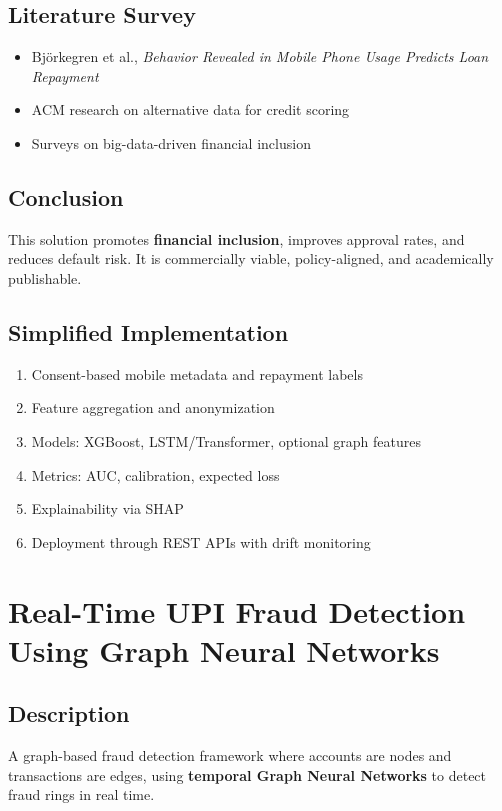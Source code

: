 \documentclass[11pt,a4paper]{article}
\begin{document}
\subsection*{Literature Survey}
\begin{itemize}[noitemsep]
    \item Björkegren et al., \textit{Behavior Revealed in Mobile Phone Usage Predicts Loan Repayment}
    \item ACM research on alternative data for credit scoring
    \item Surveys on big-data-driven financial inclusion
\end{itemize}

\subsection*{Conclusion}
This solution promotes \textbf{financial inclusion}, improves approval rates, and reduces default risk.  
It is commercially viable, policy-aligned, and academically publishable.

\subsection*{Simplified Implementation}
\begin{enumerate}[noitemsep]
    \item Consent-based mobile metadata and repayment labels
    \item Feature aggregation and anonymization
    \item Models: XGBoost, LSTM/Transformer, optional graph features
    \item Metrics: AUC, calibration, expected loss
    \item Explainability via SHAP
    \item Deployment through REST APIs with drift monitoring
\end{enumerate}

\section{Real-Time UPI Fraud Detection Using Graph Neural Networks}

\subsection*{Description}
A graph-based fraud detection framework where accounts are nodes and transactions are edges, using \textbf{temporal Graph Neural Networks} to detect fraud rings in real time.
\end{document}
